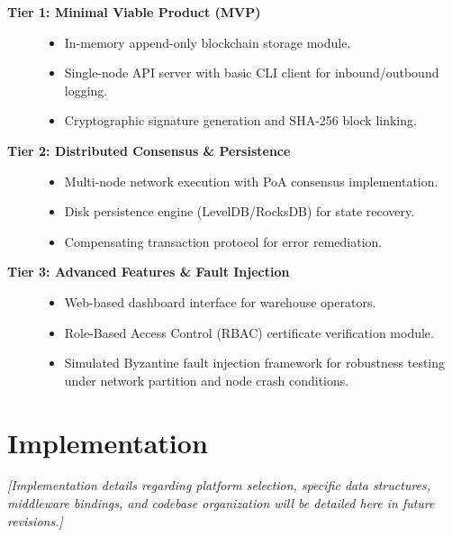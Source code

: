 \documentclass[11pt,a4paper]{memoir}
\begin{document}
\begin{description}
    \item[\textbf{Tier 1: Minimal Viable Product (MVP)}]\hfill
    \begin{itemize}
        \item In-memory append-only blockchain storage module.
        \item Single-node API server with basic CLI client for inbound/outbound logging.
        \item Cryptographic signature generation and SHA-256 block linking.
    \end{itemize}

    \item[\textbf{Tier 2: Distributed Consensus \& Persistence}]\hfill
    \begin{itemize}
        \item Multi-node network execution with PoA consensus implementation.
        \item Disk persistence engine (LevelDB/RocksDB) for state recovery.
        \item Compensating transaction protocol for error remediation.
    \end{itemize}

    \item[\textbf{Tier 3: Advanced Features \& Fault Injection}]\hfill
    \begin{itemize}
        \item Web-based dashboard interface for warehouse operators.
        \item Role-Based Access Control (RBAC) certificate verification module.
        \item Simulated Byzantine fault injection framework for robustness testing under network partition and node crash conditions.
    \end{itemize}
\end{description}

\chapter{Implementation}\label{ch:implementation}
\textit{[Implementation details regarding platform selection, specific data structures, middleware bindings, and codebase organization will be detailed here in future revisions.]}
\end{document}
